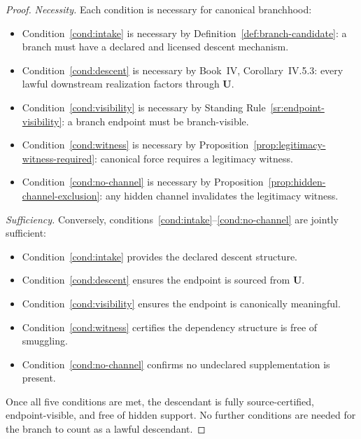 \documentclass[12pt,oneside]{amsbook}
\theoremstyle{plain}
\theoremstyle{definition}
\theoremstyle{remark}
\begin{document}
\begin{proof}
\emph{Necessity.}  Each condition is necessary for canonical
branchhood:
\begin{itemize}
  \item Condition~\ref{cond:intake} is necessary by
        Definition~\ref{def:branch-candidate}: a branch must have a
        declared and licensed descent mechanism.
  \item Condition~\ref{cond:descent} is necessary by
        Book~IV, Corollary~IV.5.3: every lawful downstream realization
        factors through $\mathbf{U}$.
  \item Condition~\ref{cond:visibility} is necessary by
        Standing Rule~\ref{sr:endpoint-visibility}: a branch endpoint
        must be branch-visible.
  \item Condition~\ref{cond:witness} is necessary by
        Proposition~\ref{prop:legitimacy-witness-required}: canonical
        force requires a legitimacy witness.
  \item Condition~\ref{cond:no-channel} is necessary by
        Proposition~\ref{prop:hidden-channel-exclusion}: any hidden
        channel invalidates the legitimacy witness.
\end{itemize}

\emph{Sufficiency.}  Conversely, conditions~\ref{cond:intake}--\ref{cond:no-channel}
are jointly sufficient:
\begin{itemize}
  \item Condition~\ref{cond:intake} provides the declared descent
        structure.
  \item Condition~\ref{cond:descent} ensures the endpoint is sourced
        from $\mathbf{U}$.
  \item Condition~\ref{cond:visibility} ensures the endpoint is
        canonically meaningful.
  \item Condition~\ref{cond:witness} certifies the dependency structure
        is free of smuggling.
  \item Condition~\ref{cond:no-channel} confirms no undeclared
        supplementation is present.
\end{itemize}
Once all five conditions are met, the descendant is fully
source-certified, endpoint-visible, and free of hidden support.  No
further conditions are needed for the branch to count as a lawful
descendant.
\end{proof}
\end{document}
